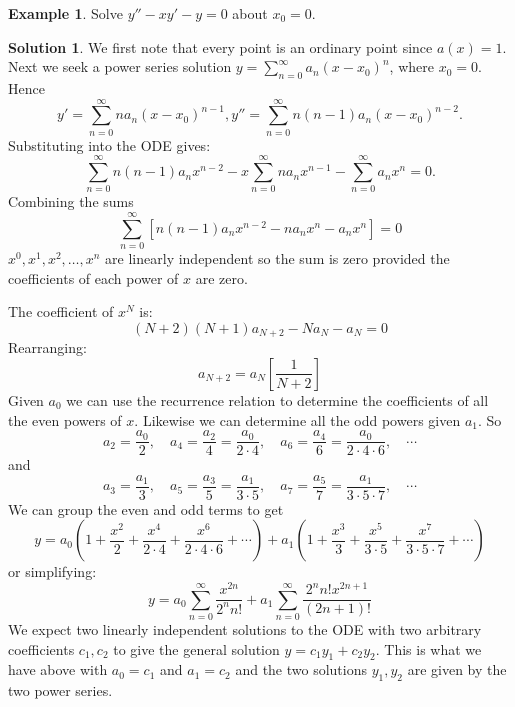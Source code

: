 \documentclass{article}
\theoremstyle{plain}
\theoremstyle{definition}
\newtheorem{exmp}{Example}[section]
\newtheorem*{sol}{Solution}
\numberwithin{equation}{section}
\begin{document}
\begin{tcolorbox}
    \begin{exmp}
        Solve $y'' -xy' - y = 0$ about $x_0=0$.
    \end{exmp}
    \begin{sol}
        We first note that every point is an ordinary point since $a(x)=1$. Next we seek a power series solution $y=\sum_{n=0}^{\infty} a_n(x-x_0)^n$, where $x_0 = 0$.
        Hence
        \[
        y' = \sum_{n=0}^{\infty} na_n(x-x_0)^{n-1}, y''= \sum_{n=0}^{\infty} n(n-1)a_n(x-x_0)^{n-2}.
        \]
        Substituting into the ODE gives:
        \[
        \sum_{n=0}^{\infty} n(n-1)a_nx^{n-2} - x \sum_{n=0}^{\infty} na_nx^{n-1} - \sum_{n=0}^{\infty} a_nx^n = 0.
        \]
        Combining the sums
        \[
            \sum_{n=0}^{\infty}  \left[ n(n-1)a_nx^{n-2} - na_nx^n - a_nx^n \right] = 0
        \]
        $x^0, x^1, x^2, \ldots, x^n$ are linearly independent so the sum is zero provided the coefficients of each power of $x$ are zero.

        The coefficient of $x^N$ is:
        \[
        (N+2)(N+1)a_{N+2} - Na_N - a_N = 0
        \]
        Rearranging:
        \begin{equation}
            \tag{Recurrence relation}
            a_{N+2} = a_N \left[ \frac{1}{N+2} \right]
        \end{equation}
        Given $a_0$ we can use the recurrence relation to determine the coefficients of all the even powers of $x$. Likewise we can determine all the odd powers given $a_1$. So
        \[
        a_2 = \frac{a_0}{2}, \quad a_4=\frac{a_2}{4}=\frac{a_0}{2\cdot 4}, \quad a_6=\frac{a_4}{6}=\frac{a_0}{2\cdot4\cdot6}, \quad\cdots
        \]
        and
        \[
        a_3 = \frac{a_1}{3}, \quad a_5=\frac{a_3}{5}=\frac{a_1}{3\cdot 5}, \quad a_7=\frac{a_5}{7}=\frac{a_1}{3\cdot5\cdot7}, \quad\cdots
        \]
        We can group the even and odd terms to get
        \[
         y = a_0\left(1+\frac{x^2}{2} + \frac{x^4}{2\cdot4} + \frac{x^6}{2\cdot4\cdot6} + \cdots\right) + a_1\left(1+\frac{x^3}{3} + \frac{x^5}{3\cdot5} + \frac{x^7}{3\cdot5\cdot7} + \cdots\right)
        \]
        or simplifying:
        \[
        y = a_0 \sum_{n=0}^{\infty} \frac{x^{2n}}{2^nn!} + a_1\sum_{n=0}^{\infty}\frac{2^nn!x^{2n+1}}{(2n+1)!}
        \]
        We expect two linearly independent solutions to the ODE with two arbitrary coefficients $c_1, c_2$ to give the general solution $y=c_1y_1 + c_2y_2$. This is what we have above with $a_0=c_1$ and $a_1=c_2$ and the two solutions $y_1,y_2$ are given by the two power series.


\end{sol}
\end{tcolorbox}
\end{document}
